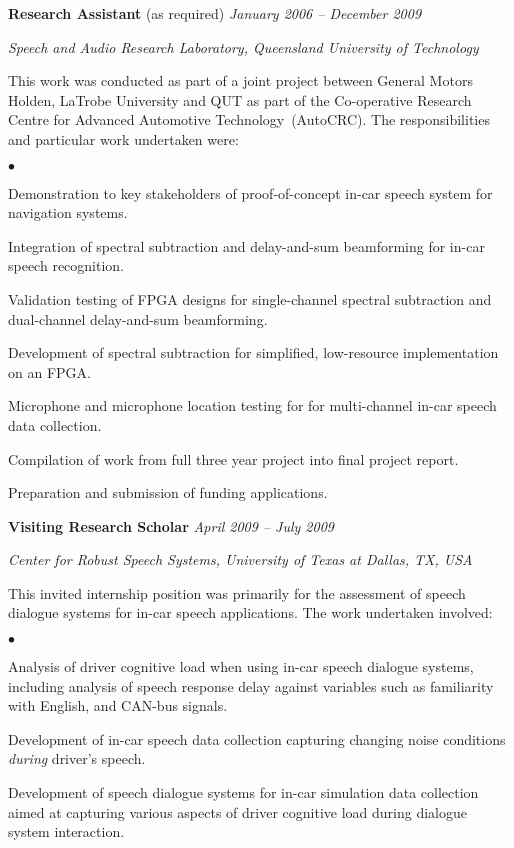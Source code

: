 \documentclass[margin,line]{resume}
\newenvironment{list1}{
  \begin{list}{}{%
      \setlength{\itemsep}{0in}
      \setlength{\parsep}{0in} \setlength{\parskip}{0in}
      \setlength{\topsep}{0in} \setlength{\partopsep}{0in}
      \setlength{\leftmargin}{0.17in}}}{\end{list}}
\newenvironment{list2}{
  \begin{list}{$\bullet$}{%
      \setlength{\itemsep}{0in}
      \setlength{\parsep}{0in} \setlength{\parskip}{0in}
      \setlength{\topsep}{0in} \setlength{\partopsep}{0in}
      \setlength{\leftmargin}{0.2in}}}{\end{list}}
\begin{document}
\begin{resume}
{\textbf{Research Assistant} (as required)} \hfill {\it January 2006 -- December 2009}\\
\vspace{-0.85\baselineskip}
\begin{list1}
\item {\it Speech and Audio Research Laboratory, Queensland University of Technology}
\item This work was conducted as part of a joint project between
    General Motors Holden, LaTrobe University and QUT as part of
    the Co-operative Research Centre for Advanced Automotive
    Technology~(AutoCRC). The responsibilities and particular work
    undertaken were:
\begin{list2}
\item Demonstration to key stakeholders of proof-of-concept in-car speech system for
    navigation systems.
\item Integration of spectral subtraction and delay-and-sum
    beamforming for in-car speech recognition.
\item Validation testing of FPGA designs for
    single-channel spectral subtraction and dual-channel delay-and-sum
    beamforming.
\item Development of spectral subtraction for simplified,
    low-resource implementation on an FPGA.
\item Microphone and microphone location testing for for
    multi-channel in-car speech data collection.
\item Compilation of work from full three year project into final
    project report.
\item Preparation and submission of funding applications.
\end{list2}
\end{list1}

{\bf Visiting Research Scholar} \hfill {\it April 2009 -- July 2009}\\
\vspace{-0.85\baselineskip}
\begin{list1}
\item {\it Center for Robust Speech Systems, University of Texas at Dallas, TX, USA}
\item This invited internship position was primarily for the
    assessment of speech dialogue systems for in-car speech
    applications. The work undertaken involved:
\begin{list2}
\item Analysis of driver cognitive load when using in-car speech dialogue systems, including analysis of speech response delay against variables such as familiarity with English, and CAN-bus signals.
\item Development of in-car speech data collection capturing changing noise conditions \emph{during} driver's speech.
\item Development of speech dialogue systems for in-car simulation data collection aimed at capturing various aspects of driver cognitive load during dialogue system interaction.
\end{list2}
\end{list1}


\end{resume}
\end{document}
